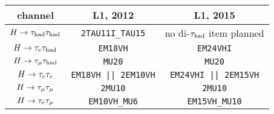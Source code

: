 \begin{tabular}{c|c|c}
  channel      & L1, 2012                    & L1, 2015 \\
  \hline\hline
  $H\rightarrow\tau_\text{had}\tau_\text{had}$ & \texttt{2TAU11I\_TAU15}     & no di-$\tau_\text{had}$ item planned  \\
  \hline
  $H\rightarrow\tau_e \tau_\text{had}$ & \texttt{EM18VH}             & \texttt{EM24VHI}            \\
  $H\rightarrow\tau_\mu \tau_\text{had}$ & \texttt{MU20}               & \texttt{MU20}               \\
  \hline
  $H\rightarrow\tau_e \tau_e$ & \texttt{EM18VH || 2EM10VH}  & \texttt{EM24VHI || 2EM15VH} \\
  $H\rightarrow\tau_\mu \tau_\mu$ & \texttt{2MU10}              & \texttt{2MU10}              \\
  $H\rightarrow\tau_e \tau_\mu$ & \texttt{EM10VH\_MU6}        & \texttt{EM15VH\_MU10}       \\
  \hline\hline
\end{tabular}

